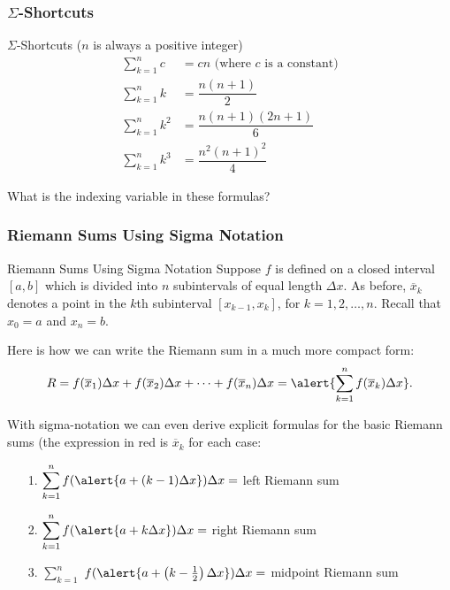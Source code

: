 \documentclass[cal1spr16Lectures.tex]{subfiles}
\begin{document}
\subsubsection{$\Sigma$-Shortcuts}

\begin{frame}{\small $\Sigma$-Shortcuts}\footnotesize
($n$ is always a positive integer)
\vspace{-1pc}
\begin{align*}
\sum_{k=1}^n c & = cn \text{ (where $c$ is a constant)} \\%
\sum_{k=1}^n k &= \dfrac{n(n+1)}{2} \\%
\sum_{k=1}^n k^2 &= \dfrac{n(n+1)(2n+1)}{6} \\%
\sum_{k=1}^n k^3 &= \dfrac{n^2(n+1)^2}{4}
\end{align*}
\vspace{-1.5pc}
\begin{que}
What is the indexing variable in these formulas?
\end{que}
\end{frame}

\subsubsection{Riemann Sums Using Sigma Notation}

\begin{frame}{\small Riemann Sums Using Sigma Notation}\footnotesize
Suppose $f$ is defined on a closed interval $[a,b]$ which is divided into $n$ subintervals of equal length $\Delta x$.  As before, $\overline{x}_k$ denotes a point in the $k$th subinterval $[x_{k-1},x_k]$, for $k=1,2,\dots,n$.  Recall that $x_0=a$ and $x_n=b$. 

\vspace{1pc}
Here is how we can write the Riemann sum in a much more compact form:
\vspace{-1pc}
\[
R = f(\overline{x}_1)\Delta x + f(\overline{x}_2)\Delta x + \cdots + f(\overline{x}_n)\Delta x 
 = \alert{\sum_{k=1}^n f(\overline{x}_k) \Delta x}.
\]
\end{frame}

\begin{frame}
With sigma-notation we can even derive explicit formulas for the basic Riemann sums (the expression in \alert{red} is $\overline x_k$ for each case:

\begin{itemize}
\item[1.] $\displaystyle\sum_{k=1}^n f(\alert{a+(k-1)\Delta x}) \Delta x=$ left Riemann sum
\item[2.] $\displaystyle\sum_{k=1}^n f(\alert{a+k\Delta x}) \Delta x=$  right Riemann sum
\item[3.] $\displaystyle\sum_{k=1}^n$\hspace{-1pt} $f(\alert{a+\left(k-\frac{1}{2}\right)\Delta x}) \Delta x=$ midpoint Riemann sum
\end{itemize}
\end{frame}
\end{document}
